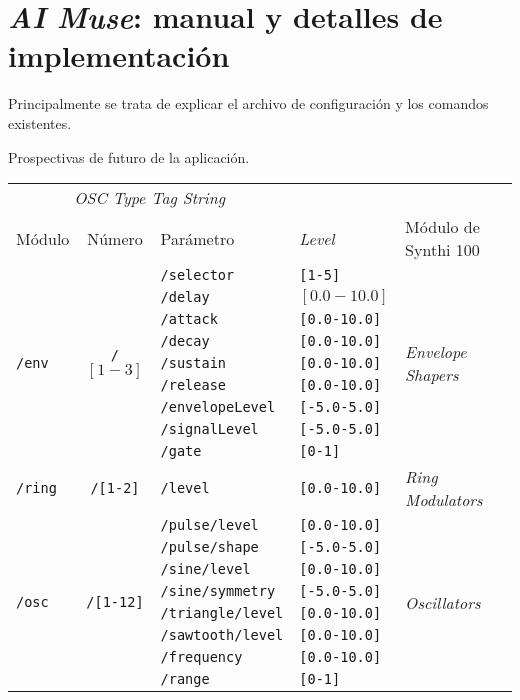 \chapter{\emph{AI Muse}: manual y detalles de implementación}
\label{anexo:aimuse}


Principalmente se trata de explicar el archivo de configuración y los comandos existentes.

Prospectivas de futuro de la aplicación.



\begin{longtable}{ l c l l l }
	
    \multicolumn{3}{c}{\textit{OSC Type Tag String}} \\
    \cline{1-3}
    Módulo			& Número			& Parámetro				& \textit{Level} 	& Módulo de Synthi 100 \\
    
    \hline 
    \multirow{9}{*}{\texttt{/env}}	& \multirow{9}{*}{\texttt{/$[1-3]$}}
    & \texttt{/selector}	&\texttt{[1-5]} & \multirow{9}{*}{\textit{Envelope Shapers}}\\
    & & \texttt{/delay} & $[0.0-10.0]$ & \\
    & & \texttt{/attack} & \texttt{[0.0-10.0]} & \\
    & & \texttt{/decay} & \texttt{[0.0-10.0]} &\\
    & & \texttt{/sustain} & \texttt{[0.0-10.0]}  &\\
    & & \texttt{/release} & \texttt{[0.0-10.0]} &\\
    & & \texttt{/envelopeLevel} & \texttt{[-5.0-5.0]} &\\
    & & \texttt{/signalLevel} & \texttt{[-5.0-5.0]} &\\
    & & \texttt{/gate} & \texttt{[0-1]} &\\
    \hline
    
    \multirow{1}{*}{\texttt{/ring}}	& \multirow{1}{*}{\texttt{/[1-2]}}	& \texttt{/level}	&\texttt{[0.0-10.0]} & \multirow{1}{*}{\textit{Ring Modulators}}\\
    \hline
    
    \hline 
    \multirow{8}{*}{\texttt{/osc}}	& \multirow{8}{*}{\texttt{/[1-12]}}	& \texttt{/pulse/level}	&\texttt{[0.0-10.0]} & \multirow{8}{*}{\textit{Oscillators}}\\
    & & \texttt{/pulse/shape} & \texttt{[-5.0-5.0]} & \\
    & & \texttt{/sine/level} & \texttt{[0.0-10.0]} & \\
    & & \texttt{/sine/symmetry} & \texttt{[-5.0-5.0]} &\\
    & & \texttt{/triangle/level} & \texttt{[0.0-10.0]}  &\\
    & & \texttt{/sawtooth/level} & \texttt{[0.0-10.0]} &\\
    & & \texttt{/frequency} & \texttt{[0.0-10.0]} &\\
    & & \texttt{/range} & \texttt{[0-1]} &\\
    

\end{longtable}
